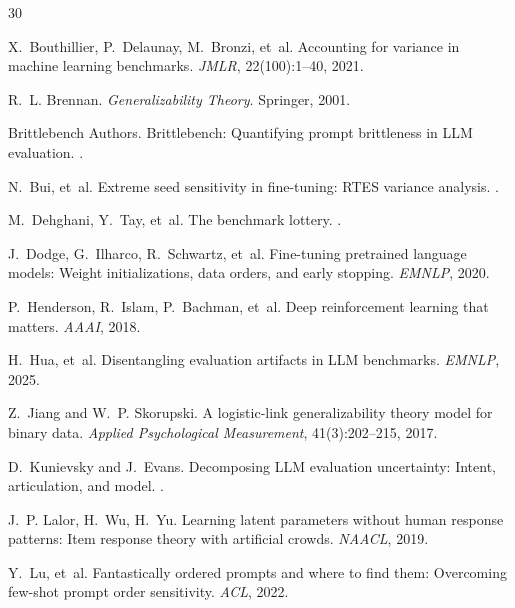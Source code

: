 \documentclass[11pt,letterpaper]{article}
\begin{document}
\begin{thebibliography}{30}

X.~Bouthillier, P.~Delaunay, M.~Bronzi, et~al.
\newblock Accounting for variance in machine learning benchmarks.
\newblock \emph{JMLR}, 22(100):1--40, 2021.

R.~L. Brennan.
\newblock \emph{Generalizability Theory}.
\newblock Springer, 2001.

Brittlebench Authors.
\newblock Brittlebench: Quantifying prompt brittleness in {LLM} evaluation.
.

N.~Bui, et~al.
\newblock Extreme seed sensitivity in fine-tuning: {RTES} variance analysis.
.

M.~Dehghani, Y.~Tay, et~al.
\newblock The benchmark lottery.
.

J.~Dodge, G.~Ilharco, R.~Schwartz, et~al.
\newblock Fine-tuning pretrained language models: Weight initializations, data orders, and early stopping.
\newblock \emph{EMNLP}, 2020.

P.~Henderson, R.~Islam, P.~Bachman, et~al.
\newblock Deep reinforcement learning that matters.
\newblock \emph{AAAI}, 2018.

H.~Hua, et~al.
\newblock Disentangling evaluation artifacts in {LLM} benchmarks.
\newblock \emph{EMNLP}, 2025.

Z.~Jiang and W.~P. Skorupski.
\newblock A logistic-link generalizability theory model for binary data.
\newblock \emph{Applied Psychological Measurement}, 41(3):202--215, 2017.

D.~Kunievsky and J.~Evans.
\newblock Decomposing {LLM} evaluation uncertainty: Intent, articulation, and model.
.

J.~P. Lalor, H.~Wu, H.~Yu.
\newblock Learning latent parameters without human response patterns: Item response theory with artificial crowds.
\newblock \emph{NAACL}, 2019.

Y.~Lu, et~al.
\newblock Fantastically ordered prompts and where to find them: Overcoming few-shot prompt order sensitivity.
\newblock \emph{ACL}, 2022.


\end{thebibliography}
\end{document}
